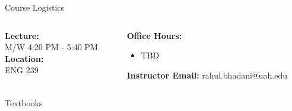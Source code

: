 \documentclass[aspectratio=169,xcolor=dvipsnames,svgnames,x11names,fleqn]{beamer}
\begin{document}

\begin{frame}{Course Logistics
}
  \begin{columns}[T] %
    \begin{column}{0.5\textwidth}
      \textbf{Lecture:} \\
      M/W 4:20 PM - 5:40 PM \\
      \vspace{0.3cm}
      \textbf{Location:} \\
      ENG 239 \\
      
    \end{column}
    \begin{column}{0.5\textwidth}
      \textbf{Office Hours:}
      \begin{itemize}
        \item TBD
      \end{itemize}
      \textbf{Instructor Email:} rahul.bhadani@uah.edu
    \end{column}
  \end{columns}
\end{frame}

\begin{frame}{Textbooks}

\end{frame}
\end{document}
